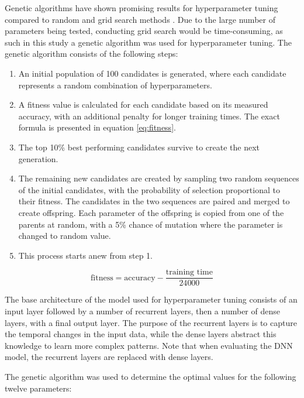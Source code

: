 Genetic algorithms have shown promising results for hyperparameter tuning compared to random and grid search methods \cite{genetic-algorithms}. Due to the large number of parameters being tested, conducting grid search would be time-consuming, as such in this study a genetic algorithm was used for hyperparameter tuning. The genetic algorithm consists of the following steps:

\begin{enumerate}
	\item An initial population of 100 candidates is generated, where each candidate represents a random combination of hyperparameters.
	\item A fitness value is calculated for each candidate based on its measured accuracy, with an additional penalty for longer training times. The exact formula is presented in equation \ref{eq:fitness}.
	\item The top 10\% best performing candidates survive to create the next generation.
	\item The remaining new candidates are created by sampling two random sequences of the initial candidates, with the probability of selection proportional to their fitness. The candidates in the two sequences are paired and merged to create offspring. Each parameter of the offspring is copied from one of the parents at random, with a 5\% chance of mutation where the parameter is changed to random value.
	\item This process starts anew from step 1.
\end{enumerate}

\begin{equation}
	\text{fitness} = \text{accuracy} - \frac{\text{training time}}{24 000}
	\label{eq:fitness}
\end{equation}

The base architecture of the model used for hyperparameter tuning consists of an input layer followed by a number of recurrent layers, then a number of dense layers, with a final output layer. The purpose of the recurrent layers is to capture the temporal changes in the input data, while the dense layers abstract this knowledge to learn more complex patterns. Note that when evaluating the DNN model, the recurrent layers are replaced with dense layers.

The genetic algorithm was used to determine the optimal values for the following twelve parameters:

